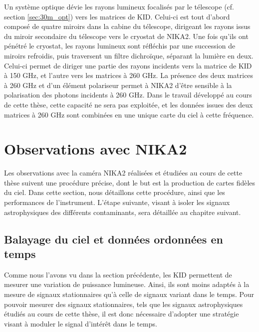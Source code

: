 Un système optique dévie les rayons lumineux focalisés par le télescope (cf. section \ref{sec:30m_opt}) vers les matrices de KID.
Celui-ci est tout d'abord composé de quatre miroirs dans la cabine du télescope, dirigeant les rayons issus du miroir secondaire du télescope vers le cryostat de NIKA2.
Une fois qu'ils ont pénétré le cryostat, les rayons lumineux sont réfléchis par une succession de miroirs refroidis, puis traversent un filtre dichroïque, séparant la lumière en deux.
Celui-ci permet de diriger une partie des rayons incidents vers la matrice de KID à 150 GHz, et l'autre vers les matrices à 260 GHz.
La présence des deux matrices à 260 GHz et d'un élément polariseur permet à NIKA2 d'être sensible à la polarisation des photons incidents à 260 GHz.
Dans le travail développé au cours de cette thèse, cette capacité ne sera pas exploitée, et les données issues des deux matrices à 260 GHz sont combinées en une unique carte du ciel à cette fréquence.

\section{Observations avec NIKA2} \label{sec:nk_obs}

Les observations avec la caméra NIKA2 réalisées et étudiées au cours de cette thèse suivent une procédure précise, dont le but est la production de cartes fidèles du ciel.
Dans cette section, nous détaillons cette procédure, ainsi que les performances de l'instrument.
L'étape suivante, visant à isoler les signaux astrophysiques des différents contaminants, sera détaillée au chapitre suivant.

\subsection{Balayage du ciel et données ordonnées en temps} \label{sec:nk_otf_toi}

Comme nous l'avons vu dans la section précédente, les KID permettent de mesurer une variation de puissance lumineuse.
Ainsi, ils sont moins adaptés à la mesure de signaux stationnaires qu'à celle de signaux variant dans le temps.
Pour pouvoir mesurer des signaux stationnaires, tels que les signaux astrophysiques étudiés au cours de cette thèse, il est donc nécessaire d'adopter une stratégie visant à moduler le signal d'intérêt dans le temps.

